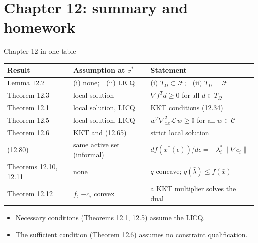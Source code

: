 \documentclass[aspectratio=169,12pt]{beamer}
\newcommand{\xs}{x^{*}}
\newcommand{\gradf}{\nabla f}
\newcommand{\ls}{\lambda^{*}}
\newcommand{\cC}{\mathcal{C}}
\newcommand{\cF}{\mathcal{F}}
\newcommand{\cL}{\mathcal{L}}
\newcommand{\TO}{T_{\Omega}}
\newcommand{\hessL}{\nabla_{xx}^{2}\cL}
\begin{document}
\section{Chapter 12: summary and homework}

\begin{frame}{Chapter 12 in one table}
  \begin{center}\small\setlength\tabcolsep{5pt}
  \renewcommand{\arraystretch}{1.2}
  \begin{tabular}{lll}
    \toprule
    Result & Assumption at $\xs$ & Statement \\
    \midrule
    Lemma 12.2 & (i) none;\ \ (ii) LICQ & (i) $\TO\subset\cF$;\ \ (ii) $\TO=\cF$ \\
    Theorem 12.3 & local solution & $\gradf^{T}d\ge 0$ for all $d\in\TO$ \\
    Theorem 12.1 & local solution, LICQ & KKT conditions (12.34) \\
    Theorem 12.5 & local solution, LICQ & $w^{T}\hessL\,w\ge 0$ for all $w\in\cC$ \\
    Theorem 12.6 & KKT and (12.65) & strict local solution \\
    (12.80) & same active set (informal) & $df(\xs(\epsilon))/d\epsilon=-\ls_{i}\|\nabla c_{i}\|$ \\
    Theorems 12.10, 12.11 & none & $q$ concave; $q(\bar\lambda)\le f(\bar x)$ \\
    Theorem 12.12 & $f$, $-c_{i}$ convex & a KKT multiplier solves the dual \\
    \bottomrule
  \end{tabular}
  \end{center}
  \begin{itemize}\setlength\itemsep{0.3em}
    \item Necessary conditions (Theorems 12.1, 12.5) assume the LICQ.
    \item The sufficient condition (Theorem 12.6) assumes no constraint qualification.
  \end{itemize}
\end{frame}
\end{document}
